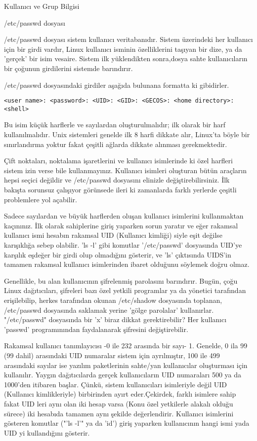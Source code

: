 \begin{section}{Kullanıcı ve Grup Bilgisi}
\begin{subsection}{/etc/passwd dosyası}

/etc/passwd dosyası sistem kullanıcı veritabanıdır. Sistem üzerindeki her kullanıcı için bir girdi vardır, Linux kullanıcı isminin özelliklerini taşıyan bir dize, ya da 'gerçek' bir isim vesaire. Sistem ilk yüklendikten sonra,dosya sahte kullanıcıların bir çoğunun girdilerini sistemde barındırır.

/etc/passwd dosyasındaki girdiler aşağıda bulunana formatta ki gibidirler.
\begin{verbatim}
<user name>: <password>: <UID>: <GID>: <GECOS>: <home directory>: <shell>
\end{verbatim}

Bu isim küçük harflerle ve sayılardan oluşturulmalıdır; ilk olarak bir harf kullanılmalıdır. Unix sistemleri genelde ilk 8 harfi dikkate alır, Linux'ta böyle bir sınırlandırma yoktur fakat çeşitli ağlarda dikkate alınması gerekmektedir.

Çift noktaları, noktalama işaretlerini ve kullanıcı isimlerinde ki özel harfleri sistem izin verse bile kullanmayınız. Kullanıcı isimleri oluşturan bütün araçların hepsi seçici değildir ve /etc/passwd dosyasını elinizle değiştirebilirsiniz. İlk bakışta sorunsuz çalışıyor görünsede ileri ki zamanlarda farklı yerlerde çeşitli problemlere yol açabilir.

Sadece sayılardan ve büyük harflerden oluşan kullanıcı isimlerini kullanmaktan kaçınınız. İlk olarak sahiplerine giriş yaparken sorun yaratır ve eğer rakamsal kullanıcı ismi hesabın rakamsal UID (Kullanıcı kimliği) siyle eşit değilse karışıklığa sebep olabilir. 'ls -l' gibi komutlar '/etc/passwd' dosyasında UID'ye karşılık eşdeğer bir girdi olup olmadığını gösterir, ve 'ls' çıktısında UIDS'in tamamen rakamsal kullanıcı isimlerinden ibaret olduğunu söylemek doğru olmaz.

Genellikle, bu alan kullanıcının şifrelenmiş parolasını barındırır. Bugün, çoğu Linux dağıtıcıları, şifreleri bazı özel yetkili programlar ya da yönetici tarafından erişilebilip, herkes tarafından okunan /etc/shadow dosyasında toplanan, /etc/passwd dosyasında saklamak yerine 'gölge parolalar' kullanırlar. "/etc/passwd" dosyasında bir 'x' biraz dikkat gerektirebilir? Her kullanıcı 'passwd' programınından faydalanarak şifresini değiştirebilir.

Rakamsal kullanıcı tanımlayıcısı -0 ile 232 arasında bir sayı- 1. Genelde, 0 ila 99 (99 dahil) arasındaki UID numaralar sistem için ayrılmıştır, 100 ile 499 arasındaki sayılar ise yazılım paketlerinin sahte/yan kullanıcılar oluşturması için kullanılır. Yaygın dağıtıcılarda gerçek kullanıcıların UID numaraları 500 ya da 1000'den itibaren başlar. Çünkü, sistem kullanıcıları isimleriyle değil UID (Kullanıcı kimlikleriyle) birbirinden ayırt eder.Çekirdek, farklı isimlere sahip fakat UID leri aynı olan iki hesap varsa (Konu özel yetkilerle alakalı olduğu sürece) iki hesabıda tamamen aynı şekilde değerlendirir. Kullanıcı isimlerini gösteren komutlar ("'ls -l'" ya da 'id') giriş yaparken kullanıcının hangi ismi yada UID yi kullandığını gösterir.


\end{subsection}
\end{section}
